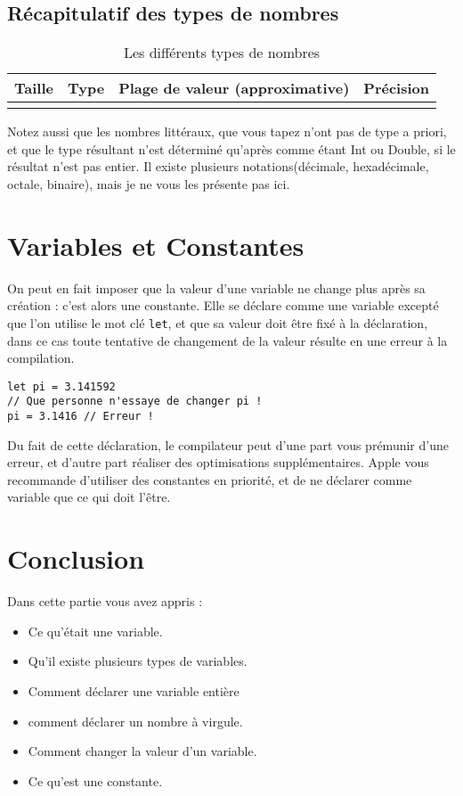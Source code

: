 \subsection{Récapitulatif des types de nombres}
\begin{longtabu} to \linewidth {|X[2,l,m]|X[1,l,m]|X[4,r,m]|X[2,r,m]|}
\hline Taille & Type & Plage de valeur (approximative) & Précision \\ \hline
\endhead


\caption{Les différents types de nombres}
\end{longtabu}
Notez aussi que les nombres littéraux, que vous tapez n'ont pas de type a priori, et que le type résultant n'est déterminé qu'après comme étant Int ou Double, si le résultat n'est pas entier. Il existe plusieurs notations(décimale, hexadécimale, octale, binaire), mais je ne vous les présente pas ici.
\section{Variables et Constantes}
On peut en fait imposer que la valeur d'une variable ne change plus après sa création :
c'est alors une constante. Elle se déclare comme une variable excepté que l'on utilise le
mot clé \texttt{let}, et que sa valeur doit être fixé à la déclaration, dans ce cas toute tentative de changement de la valeur résulte en une erreur à la compilation.
\begin{listing}[h]
\begin{verbatim}
let pi = 3.141592
// Que personne n'essaye de changer pi !
pi = 3.1416 // Erreur !
\end{verbatim}
\end{listing}

Du fait de cette déclaration, le compilateur peut d'une part vous prémunir d'une erreur, et
d'autre part réaliser des optimisations supplémentaires. Apple vous recommande d'utiliser
des constantes en priorité, et de ne déclarer comme variable que ce qui doit l'être.
\section*{Conclusion}
{}
Dans cette partie vous avez appris :
\begin{itemize}
\item Ce qu'était une variable.
\item Qu'il existe plusieurs types de variables.
\item Comment déclarer une variable entière
\item comment déclarer un nombre à virgule.
\item Comment changer la valeur d'un variable.
\item Ce qu'est une constante.
\end{itemize}
